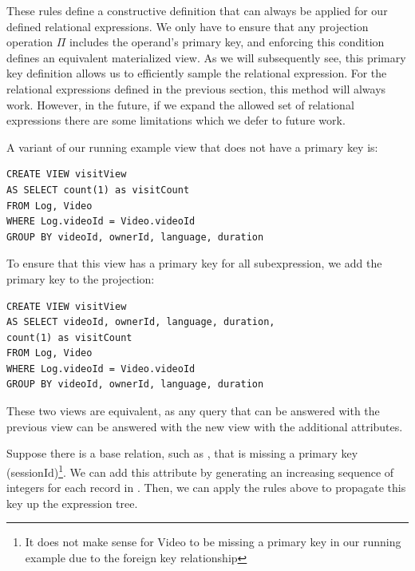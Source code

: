 These rules define a constructive definition that can always be applied for our defined relational expressions. 
We only have to ensure that any projection operation $\Pi$ includes the operand's primary key, and enforcing this condition
defines an equivalent materialized view.
As we will subsequently see, this primary key definition allows us to efficiently sample the relational expression.
For the relational expressions defined in the previous section, this method will always work.
However, in the future, if we expand the allowed set of relational expressions there are some limitations which we defer to future work.

\begin{example}
A variant of our running example view that does not have a primary key is:
\begin{lstlisting}[mathescape,basicstyle={\scriptsize}]
CREATE VIEW visitView
AS SELECT count(1) as visitCount
FROM Log, Video
WHERE Log.videoId = Video.videoId
GROUP BY videoId, ownerId, language, duration
\end{lstlisting}

To ensure that this view has a primary key for all subexpression,
we add the primary key to the projection:
\begin{lstlisting}[mathescape,basicstyle={\scriptsize}]
CREATE VIEW visitView
AS SELECT videoId, ownerId, language, duration,
count(1) as visitCount
FROM Log, Video
WHERE Log.videoId = Video.videoId
GROUP BY videoId, ownerId, language, duration
\end{lstlisting}
These two views are equivalent, as any query that can be answered with the previous view can be answered with 
the new view with the additional attributes.

Suppose there is a base relation, such as , that is missing a primary key (sessionId)\footnote{It does not make sense for Video to be missing a primary key in our running example due to the foreign key relationship}.
We can add this attribute by generating an increasing sequence of integers for each record in .
Then, we can apply the rules above to propagate this key up the expression tree.
\end{example}

